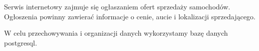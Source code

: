 \documentclass[a4paper,11pt]{article}
\begin{document}

Serwis internetowy zajmuje się ogłaszaniem ofert sprzedaży samochodów.
Ogłoszenia powinny zawierać informacje o cenie, aucie i lokalizacji sprzedającego.

W celu przechowywania i organizacji danych wykorzystamy bazę danych postgresql.
\end{document}
